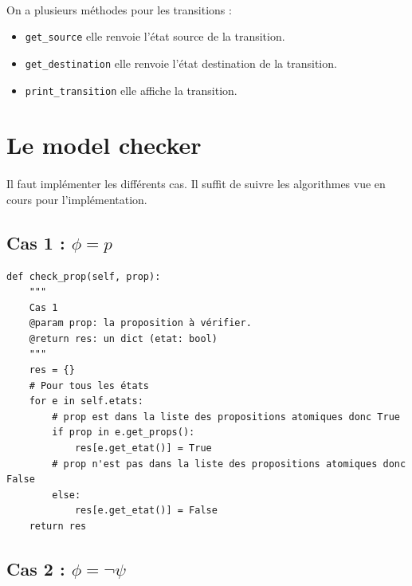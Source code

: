 \documentclass[12pt,a4paper]{report}
\begin{document}
\paragraph{}On a plusieurs méthodes pour les transitions :

\begin{itemize}
    \item \verb+get_source+ elle renvoie l'état source de la transition.
    \item \verb+get_destination+ elle renvoie l'état destination de la transition.
    \item \verb+print_transition+ elle affiche la transition.
\end{itemize}

\section*{Le model checker}

\paragraph{}Il faut implémenter les différents cas. Il suffit de suivre les algorithmes vue en cours pour l'implémentation.

\subsection*{Cas 1 : $\phi = p$}

\begin{verbatim}
def check_prop(self, prop):
    """
    Cas 1
    @param prop: la proposition à vérifier.
    @return res: un dict (etat: bool)
    """
    res = {}
    # Pour tous les états
    for e in self.etats:
        # prop est dans la liste des propositions atomiques donc True
        if prop in e.get_props():
            res[e.get_etat()] = True
        # prop n'est pas dans la liste des propositions atomiques donc False
        else:
            res[e.get_etat()] = False
    return res
\end{verbatim}

\subsection*{Cas 2 : $\phi = \neg \psi$}
\end{document}
